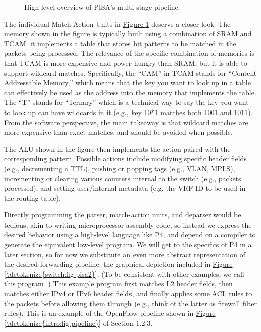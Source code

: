 \documentclass[letterpaper,11pt,english]{sphinxmanual}
\let\sphinxpxdimen\pdfpxdimen\else\newdimen\sphinxpxdimen
\begin{document}
\begin{figure}[htbp]
\centering
\capstart

\noindent\sphinxincludegraphics[width=650\sphinxpxdimen]{{Slide11}.png}
\caption{High-level overview of PISA’s multi-stage pipeline.}\label{\detokenize{switch:id10}}\label{\detokenize{switch:fig-pisa1}}\end{figure}

The individual Match-Action Units in \hyperref[\detokenize{switch:fig-pisa1}]{Figure \ref{\detokenize{switch:fig-pisa1}}}
deserve a closer look. The memory shown in the figure is typically
built using a combination of SRAM and TCAM: it implements a table that
stores bit patterns to be matched in the packets being processed. The
relevance of the specific combination of memories is that TCAM is more
expensive and power-hungry than SRAM, but it is able to support
wildcard matches. Specifically, the “CAM” in TCAM stands for “Content
Addressable Memory,” which means that the key you want to look up in a
table can effectively be used as the address into the memory that
implements the table. The “T” stands for “Ternary” which is a
technical way to say the key you want to look up can have wildcards in
it (e.g., key 10*1 matches both 1001 and 1011). From the
software perspective, the main takeaway is that wildcard matches are
more expensive than exact matches, and should be avoided when
possible.

The ALU shown in the figure then implements the action paired with the
corresponding pattern. Possible actions include modifying specific
header fields (e.g., decrementing a TTL), pushing or popping tags
(e.g., VLAN, MPLS), incrementing or clearing various counters internal
to the switch (e.g., packets processed), and setting user/internal
metadata (e.g. the VRF ID to be used in the routing table).

Directly programming the parser, match-action units, and deparser
would be tedious, akin to writing microprocessor assembly code, so
instead we express the desired behavior using a high-level language
like P4, and depend on a compiler to generate the equivalent low-level
program. We will get to the specifics of P4 in a later section, so for
now we substitute an even more abstract representation of the desired
forwarding pipeline: the graphical depiction included in
\hyperref[\detokenize{switch:fig-pisa2}]{Figure \ref{\detokenize{switch:fig-pisa2}}}. (To be consistent with other
examples, we call this program .) This example program
first matches L2 header fields, then matches either IPv4 or IPv6
header fields, and finally applies some ACL rules to the packets
before allowing them through (e.g., think of the latter as firewall
filter rules). This is an example of the OpenFlow pipeline shown in
\hyperref[\detokenize{intro:fig-pipeline}]{Figure \ref{\detokenize{intro:fig-pipeline}}} of Section 1.2.3.
\end{document}
